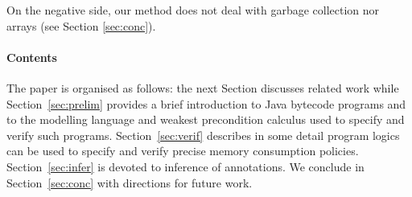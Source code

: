 On the negative side, our method does not deal with garbage collection 
nor arrays (see Section \ref{sec:conc}).

\paragraph*{Contents}
The paper is organised as follows: the next Section discusses related
work while Section~\ref{sec:prelim} provides a brief introduction to
Java bytecode programs and to the modelling language and weakest
precondition calculus used to specify and verify such programs.
Section~\ref{sec:verif} describes in some detail program logics can be
used to specify and verify precise memory consumption
policies. Section~\ref{sec:infer} is devoted to inference of
annotations. We conclude in Section~\ref{sec:conc} with directions for
future work.



